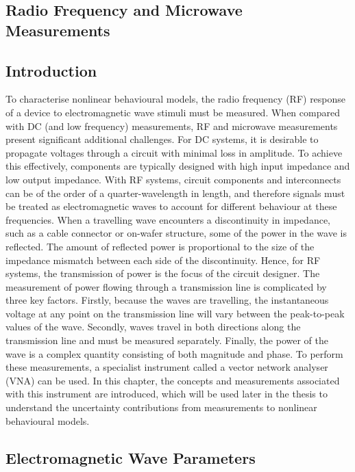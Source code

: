 \documentclass[../thesis/thesis.tex]{subfiles}
\begin{document}
\begin{refsection}
\setcounter{chapter}{1}
\chapter{Radio Frequency and Microwave \\Measurements}
\section{Introduction}

To characterise nonlinear behavioural models, the radio frequency (RF) response of a device to electromagnetic wave stimuli must be measured. When compared with DC (and low frequency) measurements, RF and microwave measurements present significant additional challenges. 
For DC systems, it is desirable to propagate voltages through a circuit with minimal loss in amplitude. To achieve this effectively, components are typically designed with high input impedance and low output impedance. With RF systems, circuit components and interconnects can be of the order of a quarter-wavelength in length, and therefore signals must be treated as electromagnetic waves to account for different behaviour at these frequencies.
When a travelling wave encounters a discontinuity in impedance, such as a cable connector or on-wafer structure, some of the power in the wave is reflected. The amount of reflected power is proportional to the size of the impedance mismatch between each side of the discontinuity. Hence, for RF systems, the transmission of power is the focus of the circuit designer. The measurement of power flowing through a transmission line is complicated by three key factors. Firstly, because the waves are travelling, the instantaneous voltage at any point on the transmission line will vary between the peak-to-peak values of the wave. Secondly, waves travel in both directions along the transmission line and must be measured separately. Finally, the power of the wave is a complex quantity consisting of both magnitude and phase.
To perform these measurements, a specialist instrument called a vector network analyser (VNA) can be used. In this chapter, the concepts and measurements associated with this instrument are introduced, which will be used later in the thesis to understand the uncertainty contributions from measurements to nonlinear behavioural models.

\section{Electromagnetic Wave Parameters}

\end{refsection}
\end{document}
